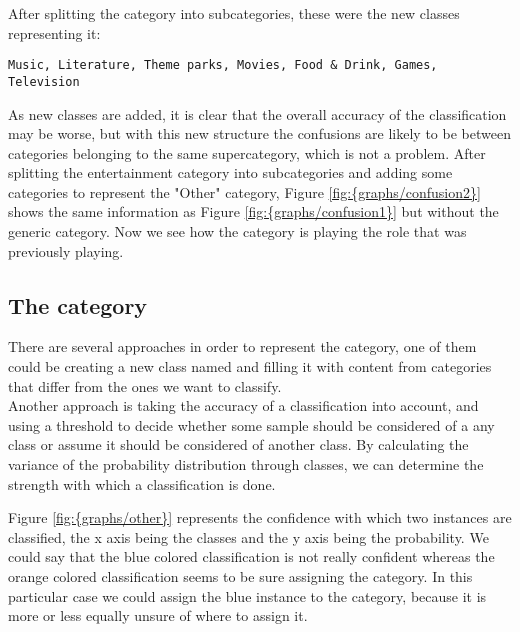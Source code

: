 
After splitting the  category into subcategories, these were the new classes representing it: \\
\begin{lstlisting} 
Music, Literature, Theme parks, Movies, Food & Drink, Games, Television
\end{lstlisting} 
As new classes are added, it is clear that the overall accuracy of the classification may be worse, but with this new structure the confusions are likely to be between categories belonging to the same
supercategory, which is not a problem.
After splitting the entertainment category into subcategories and adding some categories to represent the "Other" category, Figure \ref{fig:{graphs/confusion2}} shows the same information as 
Figure \ref{fig:{graphs/confusion1}} but without the generic  category. Now we see how the  category is playing the role that  was previously playing.


 

\subsection{The  category}
There are several approaches in order to represent the  category, one of them could be creating a new class named  and filling it with content from categories that 
differ from the ones we want to classify.\\
Another approach is taking the accuracy of a classification into account, and using a threshold to decide whether some sample should be considered of a any class or assume it should be considered of 
another class. 
By calculating the variance of the probability distribution through classes, we can determine the strength with which a classification is done.   



Figure \ref{fig:{graphs/other}} represents the confidence with which two instances are classified, the x axis being the classes
and the y axis being the probability. We could say that the blue colored classification is not really confident whereas the orange colored classification seems to be sure assigning the  
category. In this particular case we could assign the blue instance to the  category, because it is more or less equally unsure of where to assign it.

